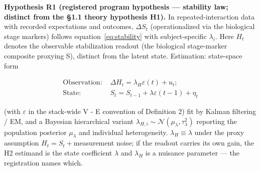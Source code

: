 \documentclass[11pt,twocolumn]{article}
\theoremstyle{gttdef}
\theoremstyle{gttplain}
\begin{document}
\textbf{Hypothesis R1 (registered program hypothesis --- stability law; distinct from the \S{}1.1 theory hypothesis H1).} In repeated-interaction data with recorded expectations and outcomes, $\Delta S_t$ (operationalized via the biological stage markers) follows equation~\eqref{eq:stability} with subject-specific $\lambda_i.$ Here $H_t$ denotes the observable stabilization readout (the biological stage-marker composite proxying S), distinct from the latent state. Estimation: state-space form

\begin{equation}
\begin{split}
\text{Observation: } & \Delta H_t = \lambda_H \varepsilon(t) + u_t;\\ \text{State: } &S_t = S_{t-1} + \lambda \varepsilon(t-1) + \eta_t
\end{split}
\label{eq:statespace}
\end{equation}

(with $\varepsilon$ in the stack-wide V - E convention of Definition 2) fit by Kalman filtering / EM, and a Bayesian hierarchical variant $\lambda_{H,i} \sim \mathcal{N}(\mu_\lambda, \tau_\lambda^{2})$ reporting the population posterior $\mu_\lambda$ and individual heterogeneity. $\lambda_H \equiv \lambda$ under the proxy assumption $H_t = S_t + {}$measurement noise; if the readout carries its own gain, the H2 estimand is the state coefficient $\lambda$ and $\lambda_H$ is a nuisance parameter --- the registration names which.
\end{document}
